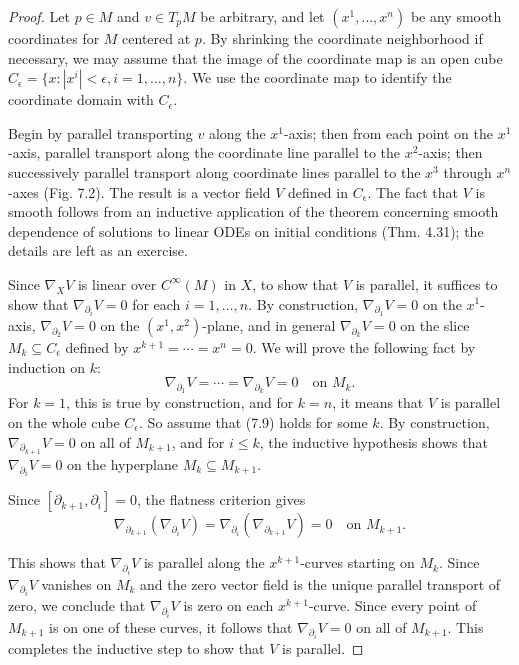 \begin{proof}
Let $p \in M$ and $v \in T_p M$ be arbitrary, and let $(x^1, \ldots, x^n)$ be any smooth coordinates for $M$ centered at $p$. By shrinking the coordinate neighborhood if necessary, we may assume that the image of the coordinate map is an open cube $C_\epsilon = \{x : |x^i| < \epsilon, i = 1, \ldots, n\}$. We use the coordinate map to identify the coordinate domain with $C_\epsilon$.

Begin by parallel transporting $v$ along the $x^1$-axis; then from each point on the $x^1$-axis, parallel transport along the coordinate line parallel to the $x^2$-axis; then successively parallel transport along coordinate lines parallel to the $x^3$ through $x^n$-axes (Fig. 7.2). The result is a vector field $V$ defined in $C_\epsilon$. The fact that $V$ is smooth follows from an inductive application of the theorem concerning smooth dependence of solutions to linear ODEs on initial conditions (Thm. 4.31); the details are left as an exercise.

Since $\nabla_X V$ is linear over $C^\infty(M)$ in $X$, to show that $V$ is parallel, it suffices to show that $\nabla_{\partial_i} V = 0$ for each $i = 1, \ldots, n$. By construction, $\nabla_{\partial_1} V = 0$ on the $x^1$-axis, $\nabla_{\partial_2} V = 0$ on the $(x^1, x^2)$-plane, and in general $\nabla_{\partial_k} V = 0$ on the slice $M_k \subseteq C_\epsilon$ defined by $x^{k+1} = \cdots = x^n = 0$. We will prove the following fact by induction on $k$:
\begin{equation}
\nabla_{\partial_1} V = \cdots = \nabla_{\partial_k} V = 0 \quad \text{on } M_k. \tag{7.9}
\end{equation}
For $k = 1$, this is true by construction, and for $k = n$, it means that $V$ is parallel on the whole cube $C_\epsilon$. So assume that (7.9) holds for some $k$. By construction, $\nabla_{\partial_{k+1}} V = 0$ on all of $M_{k+1}$, and for $i \le k$, the inductive hypothesis shows that $\nabla_{\partial_i} V = 0$ on the hyperplane $M_k \subseteq M_{k+1}$.

Since $[\partial_{k+1}, \partial_i] = 0$, the flatness criterion gives
\[
\nabla_{\partial_{k+1}}(\nabla_{\partial_i} V) = \nabla_{\partial_i} (\nabla_{\partial_{k+1}} V) = 0 \quad \text{on } M_{k+1}.
\]

This shows that $\nabla_{\partial_i} V$ is parallel along the $x^{k+1}$-curves starting on $M_k$. Since $\nabla_{\partial_i} V$ vanishes on $M_k$ and the zero vector field is the unique parallel transport of zero, we conclude that $\nabla_{\partial_i} V$ is zero on each $x^{k+1}$-curve. Since every point of $M_{k+1}$ is on one of these curves, it follows that $\nabla_{\partial_i} V = 0$ on all of $M_{k+1}$. This completes the inductive step to show that $V$ is parallel.
\end{proof}

